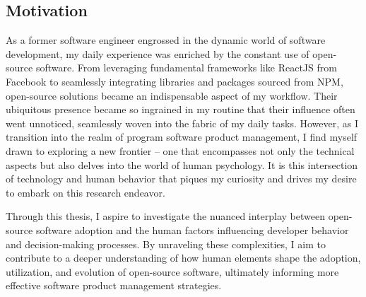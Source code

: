\subsection{Motivation}

As a former software engineer engrossed in the dynamic world of software development, my daily experience was enriched by the constant use of open-source software. From leveraging fundamental frameworks like ReactJS from Facebook to seamlessly integrating libraries and packages sourced from NPM, open-source solutions became an indispensable aspect of my workflow. Their ubiquitous presence became so ingrained in my routine that their influence often went unnoticed, seamlessly woven into the fabric of my daily tasks. However, as I transition into the realm of program software product management, I find myself drawn to exploring a new frontier – one that encompasses not only the technical aspects but also delves into the world of human psychology. It is this intersection of technology and human behavior that piques my curiosity and drives my desire to embark on this research endeavor.

Through this thesis, I aspire to investigate the nuanced interplay between open-source software adoption and the human factors influencing developer behavior and decision-making processes. By unraveling these complexities, I aim to contribute to a deeper understanding of how human elements shape the adoption, utilization, and evolution of open-source software, ultimately informing more effective software product management strategies.


\clearpage  %
